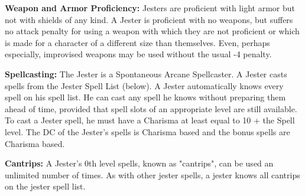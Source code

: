 \begin{minorcastingclasstable}
\end{minorcastingclasstable}

\classfeatures

\textbf{Weapon and Armor Proficiency:} Jesters are proficient with light armor but not with shields of any kind. A Jester is proficient with no weapons, but suffers no attack penalty for using a weapon with which they are not proficient or which is made for a character of a different size than themselves. Even, perhaps especially, improvised weapons may be used without the usual -4 penalty.

\textbf{Spellcasting:} The Jester is a Spontaneous Arcane Spellcaster. A Jester casts spells from the Jester Spell List (below). A Jester automatically knows every spell on his spell list. He can cast any spell he knows without preparing them ahead of time, provided that spell slots of an appropriate level are still available. To cast a Jester spell, he must have a Charisma at least equal to 10 + the Spell level. The DC of the Jester's spells is Charisma based and the bonus spells are Charisma based.

\textbf{Cantrips:} A Jester's 0th level spells, known as "cantrips", can be used an unlimited number of times. As with other jester spells, a jester knows all cantrips on the jester spell list.

